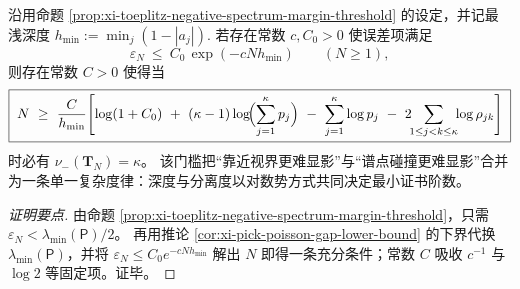 \begin{corollary}\label{cor:xi-toeplitz-visibility-complexity-threshold}
沿用命题 \ref{prop:xi-toeplitz-negative-spectrum-margin-threshold} 的设定，并记最浅深度
\(
h_{\min}:=\min_j(1-|a_j|).
\)
若存在常数 \(c,C_0>0\) 使误差项满足
\[
\varepsilon_N\ \le\ C_0\,\exp(-cNh_{\min})\qquad(N\ge 1),
\]
则存在常数 \(C>0\) 使得当
\[
\boxed{\;
N\ \ge\ \frac{C}{h_{\min}}\Biggl[
\log(1+C_0)\ +\ (\kappa-1)\log\!\Bigl(\sum_{j=1}^{\kappa}p_j\Bigr)
\ -\ \sum_{j=1}^{\kappa}\log p_j
\ -\ 2\!\!\sum_{1\le j<k\le\kappa}\!\!\log\rho_{jk}
\Biggr]\;}
\]
时必有 \(\nu_-(\mathbf{T}_N)=\kappa\)。
该门槛把“靠近视界更难显影”与“谱点碰撞更难显影”合并为一条单一复杂度律：深度与分离度以对数势方式共同决定最小证书阶数。
\end{corollary}
\begin{proof}[证明要点]
由命题 \ref{prop:xi-toeplitz-negative-spectrum-margin-threshold}，只需 \(\varepsilon_N<\lambda_{\min}(\mathsf P)/2\)。
再用推论 \ref{cor:xi-pick-poisson-gap-lower-bound} 的下界代换 \(\lambda_{\min}(\mathsf P)\)，并将
\(\varepsilon_N\le C_0e^{-cNh_{\min}}\) 解出 \(N\) 即得一条充分条件；常数 \(C\) 吸收 \(c^{-1}\) 与 \(\log 2\) 等固定项。证毕。
\end{proof}



